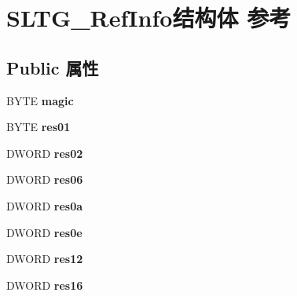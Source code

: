 \hypertarget{struct_s_l_t_g___ref_info}{}\section{S\+L\+T\+G\+\_\+\+Ref\+Info结构体 参考}
\label{struct_s_l_t_g___ref_info}
\subsection*{Public 属性}
\begin{DoxyCompactItemize}
\item 
\mbox{\label{struct_s_l_t_g___ref_info_a9fbed142b623b8a9c0964f2ed9487a09}} 
B\+Y\+TE {\bfseries magic}
\item 
\mbox{\label{struct_s_l_t_g___ref_info_ae2774615c79017fc24c34f4bc322fba7}} 
B\+Y\+TE {\bfseries res01}
\item 
\mbox{\label{struct_s_l_t_g___ref_info_aa85a2f233d36ef597e0ecec18d6f2265}} 
D\+W\+O\+RD {\bfseries res02}
\item 
\mbox{\label{struct_s_l_t_g___ref_info_aa34dfe84e6fd46e7eff14cc9b01b5277}} 
D\+W\+O\+RD {\bfseries res06}
\item 
\mbox{\label{struct_s_l_t_g___ref_info_a9dd7b8fab350923741930e9c4bd5b4b0}} 
D\+W\+O\+RD {\bfseries res0a}
\item 
\mbox{\label{struct_s_l_t_g___ref_info_a7dc6e237922b3067b120262b66e80cb3}} 
D\+W\+O\+RD {\bfseries res0e}
\item 
\mbox{\label{struct_s_l_t_g___ref_info_a71b9d5bc91c6bad9445fa6fd34261bb1}} 
D\+W\+O\+RD {\bfseries res12}
\item 
\mbox{\label{struct_s_l_t_g___ref_info_a4a7493f68f331632fb686bbb416ed05d}} 
D\+W\+O\+RD {\bfseries res16}
\item 
\mbox{\label{struct_s_l_t_g___ref_info_a9228ec944de6bf36de7e1619fe738c7f}} 

\end{DoxyCompactItemize}
